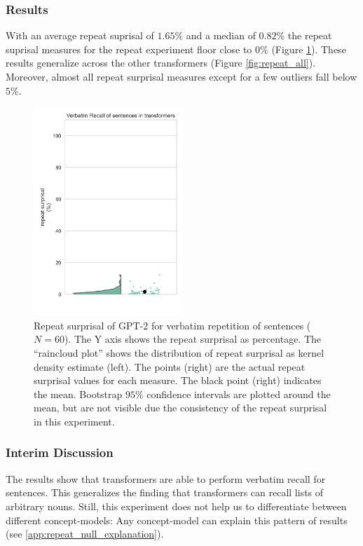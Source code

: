\subsubsection{Results} \label{ex:1_repeat_results}

With an average repeat suprisal of $1.65\%$ and a median of $0.82\%$ the repeat suprisal measures for the repeat experiment floor close to $0\%$ (Figure \ref{fig:repeat_gpt2}). These results generalize across the other transformers (Figure \ref{fig:repeat_all}). Moreover, almost all repeat surprisal measures except for a few outliers fall below $5\%$.

\begin{figure}
    \centering
    \includegraphics[width=0.5\textwidth]{experiments/repeat_surprisal_gpt2.pdf}
    \caption{Repeat surprisal of GPT-2 for verbatim repetition of sentences ($N = 60$). The Y axis shows the repeat surprisal as percentage. The ``raincloud plot'' \parencite{allen_raincloud_2019} shows the distribution of repeat surprisal as kernel density estimate (left). The points (right) are the actual repeat surprisal values for each measure. The black point (right) indicates the mean. Bootstrap $95\%$ confidence intervals are plotted around the mean, but are not visible due the consistency of the repeat surprisal in this experiment.}
    \label{fig:repeat_gpt2}
\end{figure}


\subsubsection{Interim Discussion}
The results show that transformers are able to perform verbatim recall for sentences.
This generalizes the finding that transformers can recall lists of arbitrary nouns.
Still, this experiment does not help us to differentiate between different concept-models: Any concept-model can explain this pattern of results (see \ref{app:repeat_null_explanation}).


